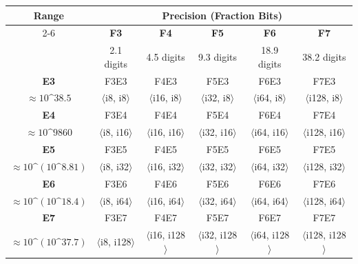 \documentclass[12pt,letter]{article}
\begin{document}
\begin{lstlisting}[caption={FE Type Configurations - Precision vs. Range}, label={fig:spirix_configurations}]
\end{lstlisting}
\begin{table}[ht]
\centering
\renewcommand{\arraystretch}{1.5}
\begin{tabular}{|c|c|c|c|c|c|}
\hline
\multirow{2}{*}{\textbf{Range}} & \multicolumn{5}{c|}{\textbf{Precision (Fraction Bits)}} \\
\cline{2-6}
 & \textbf{F3} & \textbf{F4} & \textbf{F5} & \textbf{F6} & \textbf{F7} \\
 & \small{2.1 digits} & \small{4.5 digits} & \small{9.3 digits} & \small{18.9 digits} & \small{38.2 digits} \\
\hline
\textbf{E3} & F3E3 & F4E3 & F5E3 & F6E3 & F7E3 \\
\small{$\approx 10\^{}38.5$} & \small{$\langle$i8, i8$\rangle$} & \small{$\langle$i16, i8$\rangle$} & \small{$\langle$i32, i8$\rangle$} & \small{$\langle$i64, i8$\rangle$} & \small{$\langle$i128, i8$\rangle$} \\
\hline
\textbf{E4} & F3E4 & F4E4 & F5E4 & F6E4 & F7E4 \\
\small{$\approx 10\^{}9860$} & \small{$\langle$i8, i16$\rangle$} & \small{$\langle$i16, i16$\rangle$} & \small{$\langle$i32, i16$\rangle$} & \small{$\langle$i64, i16$\rangle$} & \small{$\langle$i128, i16$\rangle$} \\
\hline
\textbf{E5} & F3E5 & F4E5 & F5E5 & F6E5 & F7E5 \\
\small{$\approx 10\^{}(10\^{}8.81)$} & \small{$\langle$i8, i32$\rangle$} & \small{$\langle$i16, i32$\rangle$} & \small{$\langle$i32, i32$\rangle$} & \small{$\langle$i64, i32$\rangle$} & \small{$\langle$i128, i32$\rangle$} \\
\hline
\textbf{E6} & F3E6 & F4E6 & F5E6 & F6E6 & F7E6 \\
\small{$\approx 10\^{}(10\^{}18.4)$} & \small{$\langle$i8, i64$\rangle$} & \small{$\langle$i16, i64$\rangle$} & \small{$\langle$i32, i64$\rangle$} & \small{$\langle$i64, i64$\rangle$} & \small{$\langle$i128, i64$\rangle$} \\
\hline
\textbf{E7} & F3E7 & F4E7 & F5E7 & F6E7 & F7E7 \\
\small{$\approx 10\^{}(10\^{}37.7)$} & \small{$\langle$i8, i128$\rangle$} & \small{$\langle$i16, i128$\rangle$} & \small{$\langle$i32, i128$\rangle$} & \small{$\langle$i64, i128$\rangle$} & \small{$\langle$i128, i128$\rangle$} \\
\hline
\end{tabular}
\end{table}
\end{document}

